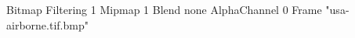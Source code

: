 {Bitmap
	{Filtering 1}
	{Mipmap 1}
	{Blend none}
	{AlphaChannel 0}
	{Frame "usa-airborne.tif.bmp"}
}
